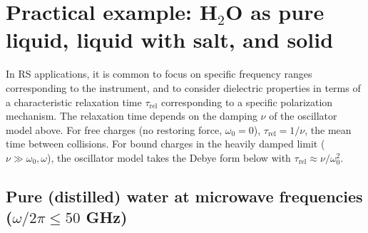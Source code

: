 \documentclass[11pt, oneside]{article}
\begin{document}
\section{Practical example: H$_2$O as pure liquid, liquid with salt, and solid}
\label{s:water}

In RS applications, it is common to focus on specific frequency ranges corresponding to the instrument, and to consider dielectric properties in terms of a characteristic relaxation time $\tau_\mathrm{rel}$ corresponding to a specific polarization mechanism.
The relaxation time depends on the damping $\nu$ of the oscillator model above. For free charges (no restoring force, $\omega_0 = 0$), $\tau_\mathrm{rel} = 1/\nu$, the mean time between collisions. For bound charges in the heavily damped limit ($\nu \gg \omega_0, \omega$), the oscillator model takes the Debye form below with $\tau_\mathrm{rel} \approx \nu/\omega_0^2$.

\subsection{Pure (distilled) water at microwave frequencies ($\omega/2\pi \le 50$ GHz)}
\end{document}
